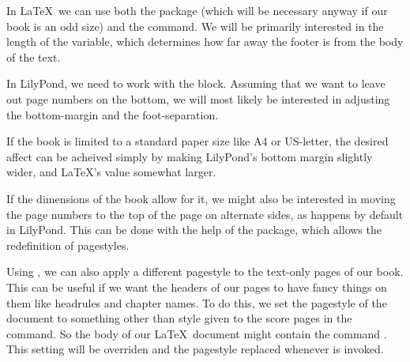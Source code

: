 \documentclass[../../LilyPond-Tutorials]{subfiles}
\begin{document}
In \LaTeX\ we can use both the  package (which will be necessary anyway if our book is an odd size) and the  command. 
We will be primarily interested in the length of the  variable, which determines how far away the footer is from the body of the text.

In LilyPond, we need to work with the  block. 
Assuming that we want to leave out page numbers on the bottom, we will most likely be interested in adjusting the  bottom-margin and the foot-separation.

If the book is limited to a standard paper size like A4 or US-letter, the desired affect can be acheived simply by making LilyPond's bottom margin slightly wider, and \LaTeX's  value somewhat larger.

If the dimensions of the book allow for it, we might also be interested in moving the page numbers to the top of the page on alternate sides, as happens by default in LilyPond. 
This can be done with the help of the  package, which allows the redefinition of pagestyles. 

Using , we can also apply a different pagestyle to the text-only pages of our book. 
This can be useful if we want the headers of our pages to have fancy things on them like headrules and chapter names. 
To do this, we set the pagestyle of the document to something other than style given to the score pages in the   command. 
So the body of our \LaTeX\ document might contain the command . 
This setting will be overriden and the pagestyle replaced whenever  is invoked.
\end{document}
